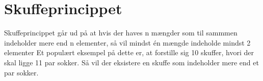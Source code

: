 \chapter{Skuffeprincippet}
Skuffeprincippet går ud på at hvis der haves n mængder som til sammmen indeholder mere end n elementer, så vil mindst én mængde indeholde mindst 2 elementer \citep{skuffep} 
Et populært eksempel på dette er, at forstille sig 10 skuffer, hvori der skal ligge 11 par sokker. Så vil der eksistere en skuffe som indeholder mere end et par sokker.  




